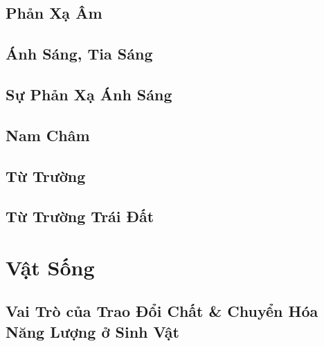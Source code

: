 \documentclass{article}
\numberwithin{equation}{section}
\begin{document}

\subsection{Phản Xạ Âm}


\subsection{Ánh Sáng, Tia Sáng}


\subsection{Sự Phản Xạ Ánh Sáng}


\subsection{Nam Châm}


\subsection{Từ Trường}


\subsection{Từ Trường Trái Đất}


\section{Vật Sống}

\subsection{Vai Trò của Trao Đổi Chất \& Chuyển Hóa Năng Lượng ở Sinh Vật}
\end{document}
